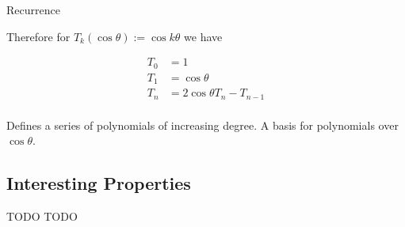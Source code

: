 \documentclass[pdf]{beamer}
\begin{document}
\begin{frame}{Recurrence}

Therefore for $T_k(\cos \theta) := \cos k \theta$ we have

\begin{align*}
  T_0 &= 1\\
  T_1 &= \cos \theta\\
  T_n &= 2 \cos \theta T_n - T_{n-1}\\
\end{align*}

Defines a series of polynomials of increasing degree. A basis for polynomials over $\cos \theta$.

\end{frame}


\subsection{Interesting Properties}

\begin{frame}{TODO}
TODO
\end{frame}
\end{document}
